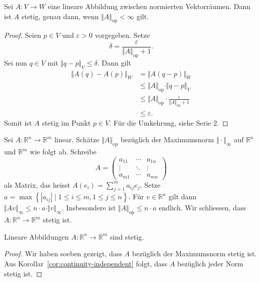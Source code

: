 \documentclass[../main.tex]{subfiles}
\begin{document}
\begin{proposition}
  Sei $A \colon V \to W$ eine lineare Abbildung zwischen
  normierten Vektorräumen.
  Dann ist $A$ stetig, genau dann, wenn
  $\Vert A \Vert_\text{op} < \infty$ gilt.
\end{proposition}

\begin{proof}
Seien $p \in V$ und $\varepsilon > 0$ 
vorgegeben.
Setze
\[
  \delta = \frac{\varepsilon}{\Vert A \Vert_{\text{op}} + 1}.
\]
Sei nun $q \in V$ mit $\Vert q - p \Vert_V \leq \delta$.
Dann gilt
\begin{align*}
  \Vert A(q) - A(p) \Vert_W
  & = \Vert A(q- p)\Vert_W\\
  &\leq \Vert A \Vert_\text{op} \cdot \Vert q - p \Vert_V \\
  & \leq \Vert A \Vert_{\text{op}} \cdot
  \frac{\varepsilon}{\Vert A \Vert_{\text{op}} + 1} \\
  &\leq \varepsilon.
\end{align*}
Somit ist $A$ stetig im Punkt $p \in V$.
Für die Umkehrung, siehe Serie 2.
\end{proof}
  
\begin{specialcase}
  Sei $A \colon \mathbb{R}^n \to \mathbb{R}^m$ linear.
  Schätze $\Vert A \Vert_{\text{op}}$ bezüglich
  der Maximumsnorm $\Vert \cdot \Vert_{\infty}$ auf
  $\mathbb{R}^n$ und $\mathbb{R}^m$ wie folgt ab.
  Schreibe
  \[
    A = 
    \begin{pmatrix}
      a_{11} & \cdots & a_{1n} \\
      \vdots & \ddots & \vdots \\
      a_{m1} & \cdots & a_{mn}
    \end{pmatrix}
  \]
  als Matrix, das heisst $A(e_i) = \sum_{j=1}^{m} a_{ij}e_j$. 
  Setze $a = \max \left\{|a_{ij}| \mid 
  1 \leq i \leq m, 1 \leq j \leq n\right\}$.
  Für $v \in \mathbb{R}^{n}$ gilt dann
  \(
    \Vert Av \Vert_\infty \leq n \cdot a \cdot \Vert v \Vert_{\infty}.
  \)
  Insbesondere ist $\Vert A \Vert_{\text{op}} \leq n \cdot a$ endlich.
  Wir schliessen, dass $A \colon \mathbb{R}^n \to \mathbb{R}^m$ stetig ist.
\end{specialcase}

\begin{corollary}
  Lineare Abbildungen $A \colon \mathbb{R}^n \to \mathbb{R}^m$ sind stetig.
\end{corollary}

\begin{proof}
  Wir haben soeben gezeigt, dass $A$ bezüglich der Maximumsnorm stetig ist.
  Aus Korollar~\ref{cor:continuity-independent} folgt, dass
  $A$ bezüglich jeder Norm stetig ist.
\end{proof}
\end{document}
